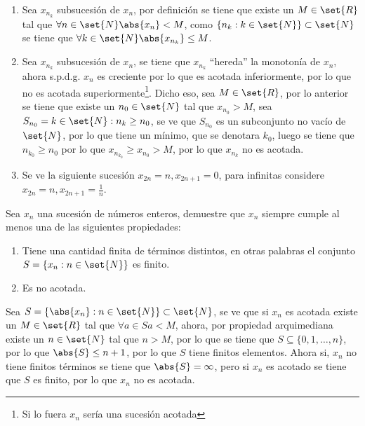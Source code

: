 \documentclass{ayudantia}
\begin{document}
\begin{ans}
    \begin{sol}
        \begin{enumerate}
            \item Sea \(x_{n_k}\) subsucesión de \(x_n\), por definición se tiene que existe un \(M\in\set{R}\) tal que \(\forall n\in\set{N} \abs{x_n}<M\), como \(\{n_k:k\in\set{N}\}\subset\set{N}\) se tiene que \(\forall k\in \set{N}\abs{x_{n_k}}\leq M\).
            \item Sea \(x_{n_k}\) subsucesión de \(x_n\), se tiene que \(x_{n_k}\) ``hereda'' la monotonía de \(x_n\), ahora s.p.d.g. \(x_n\) es creciente por lo que es acotada inferiormente, por lo que no es acotada superiormente\footnote{Si lo fuera \(x_n\) sería una sucesión acotada}. Dicho eso, sea \(M\in\set{R}\), por lo anterior se tiene que existe un \(n_0\in\set{N}\) tal que \(x_{n_0}>M\), sea \(S_{n_0}={k\in\set{N}:n_k\geq n_0}\), se ve que \(S_{n_0}\) es un subconjunto no vacío de \(\set{N}\), por lo que tiene un mínimo, que se denotara \(k_0\), luego se tiene que \(n_{k_0}\geq n_0\) por lo que \(x_{n_{k_0}}\geq x_{n_0}>M\), por lo que \(x_{n_k}\) no es acotada.
            \item Se ve la siguiente sucesión \(x_{2n}=n,x_{2n+1}=0\), para infinitas considere \(x_{2n}=n,x_{2n+1}=\frac1n\).
        \end{enumerate}
    \end{sol}
\end{ans}


\begin{prob}
    Sea \(x_n\) una sucesión de números enteros, demuestre que \(x_n\) siempre cumple al menos una de las siguientes propiedades:
    \begin{enumerate}[label=(\alph*)]
        \item Tiene una cantidad finita de términos distintos, en otras palabras el conjunto \(S=\{x_n:n\in\set{N}\}\) es finito.
        \item Es no acotada.
    \end{enumerate}
\end{prob}

\begin{ans}
    \begin{sol}
        Sea \(S=\{\abs{x_n}:n\in\set{N}\}\subset\set{N}\), se ve que si \(x_n\) es acotada existe un \(M\in\set{R}\) tal que \(\forall a\in S a<M\), ahora, por propiedad arquimediana existe un \(n\in\set{N}\) tal que \(n>M\), por lo que se tiene que \(S\subseteq\{0,1,\ldots,n\}\), por lo que \(\abs{S}\leq n+1\), por lo que \(S\) tiene finitos elementos. Ahora si, \(x_n\) no tiene finitos términos se tiene que \(\abs{S}=\infty\), pero si \(x_n\) es acotado se tiene que \(S\) es finito, por lo que \(x_n\) no es acotada.
    \end{sol}
\end{ans}
\end{document}
